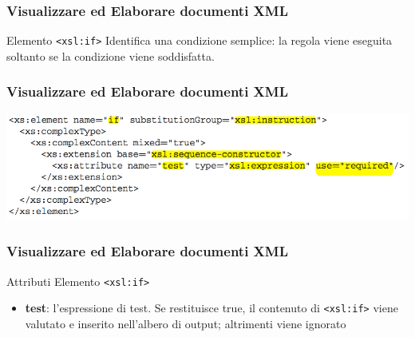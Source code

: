 \begin{frame}
    \frametitle{Visualizzare ed Elaborare documenti XML}
    \addtocounter{nframe}{1}
    

     \begin{block}{Elemento \texttt{<xsl:if>}}
        Identifica una condizione semplice: la regola viene eseguita soltanto se la condizione viene soddisfatta.
     \end{block}

\end{frame}

\begin{frame}
    \frametitle{Visualizzare ed Elaborare documenti XML}
    \addtocounter{nframe}{1}
    
    \begin{center}
        \includegraphics[width=.95\textwidth]{imgs/Schema-if.png}
    \end{center}

\end{frame}

\begin{frame}
    \frametitle{Visualizzare ed Elaborare documenti XML}
    \addtocounter{nframe}{1}
    

     \begin{block}{Attributi Elemento \texttt{<xsl:if>}}
         \begin{itemize}
             \item \textbf{test}: l’espressione di test. Se restituisce true, il contenuto di \texttt{<xsl:if>} viene valutato e inserito nell’albero di output; altrimenti viene ignorato
        \end{itemize}
     \end{block}
    
\end{frame}


